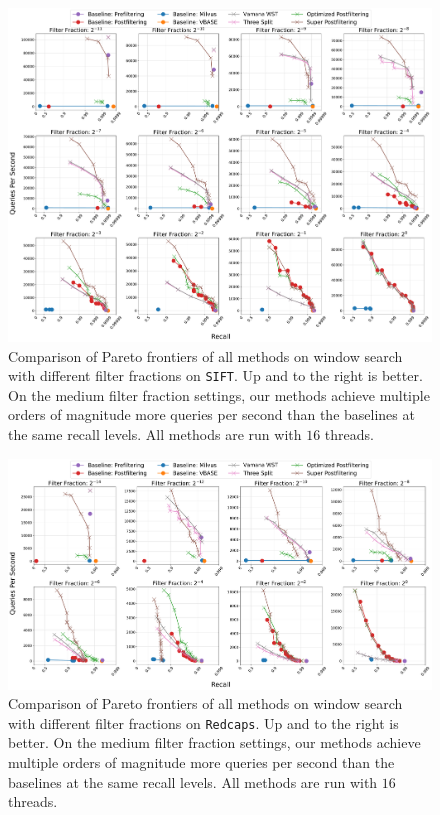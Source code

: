 \documentclass{article}
\theoremstyle{plain}
\theoremstyle{definition}
\theoremstyle{remark}
\newcommand{\datasetname}[1]{\texttt{#1}}
\begin{document}
\begin{figure}[t]
\begin{center}
\centerline{\includegraphics[width=16cm]{images/sift-128-euclidean_results_vamana.pdf}}
\caption{Comparison of Pareto frontiers of all methods on window search with different filter fractions on \datasetname{SIFT}. Up and to the right is better. On the medium filter fraction settings, our methods achieve multiple orders of magnitude more
queries per second than the baselines at the same recall levels. All methods are run with $16$ threads. }
\label{fig:sift_results}
\end{center}
\end{figure}

\begin{figure}[t]
\begin{center}
\centerline{\includegraphics[width=16cm]{images/redcaps-512-angular_results_vamana.pdf}}
\caption{Comparison of Pareto frontiers of all methods on window search with different filter fractions on \datasetname{Redcaps}. Up and to the right is better. On the medium filter fraction settings, our methods achieve multiple orders of magnitude more
queries per second than the baselines at the same recall levels. All methods are run with $16$ threads. }
\label{fig:redcaps_results}
\end{center}
\end{figure}
\end{document}
